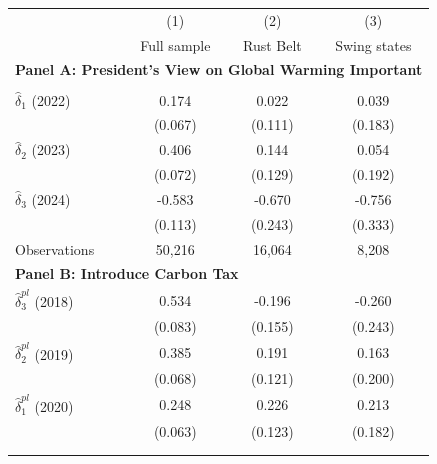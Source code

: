 \begin{tabular}{l*{3}{c}} \toprule
            &\multicolumn{1}{c}{(1)}&\multicolumn{1}{c}{(2)}&\multicolumn{1}{c}{(3)}\\
            &\multicolumn{1}{c}{Full sample}&\multicolumn{1}{c}{Rust Belt}&\multicolumn{1}{c}{Swing states}\\
\midrule \multicolumn{4}{l}{\textbf{Panel A: President's View on Global Warming Important}} \\
\addlinespace&                     &                     &                     \\
\addlinespace
$\hat{\delta}_1$ (2022)&       0.174\sym{***}&       0.022         &       0.039         \\
            &     (0.067)         &     (0.111)         &     (0.183)         \\
\addlinespace
$\hat{\delta}_2$ (2023)&       0.406\sym{***}&       0.144         &       0.054         \\
            &     (0.072)         &     (0.129)         &     (0.192)         \\
\addlinespace
$\hat{\delta}_3$ (2024)&      -0.583\sym{***}&      -0.670\sym{***}&      -0.756\sym{**} \\
            &     (0.113)         &     (0.243)         &     (0.333)         \\
\midrule
Observations&      50,216         &      16,064         &       8,208         \\
\midrule
\multicolumn{4}{l}{\textbf{Panel B: Introduce Carbon Tax}} \\
$\hat{\delta}_3^{pl}$ (2018)&       0.534\sym{***}&      -0.196         &      -0.260         \\
            &     (0.083)         &     (0.155)         &     (0.243)         \\
\addlinespace
$\hat{\delta}_2^{pl}$ (2019)&       0.385\sym{***}&       0.191         &       0.163         \\
            &     (0.068)         &     (0.121)         &     (0.200)         \\
\addlinespace
$\hat{\delta}_1^{pl}$ (2020)&       0.248\sym{***}&       0.226\sym{*}  &       0.213         \\
            &     (0.063)         &     (0.123)         &     (0.182)         \\
\addlinespace
\addlinespace&                     &                     &                     \\
\addlinespace

\end{tabular}
